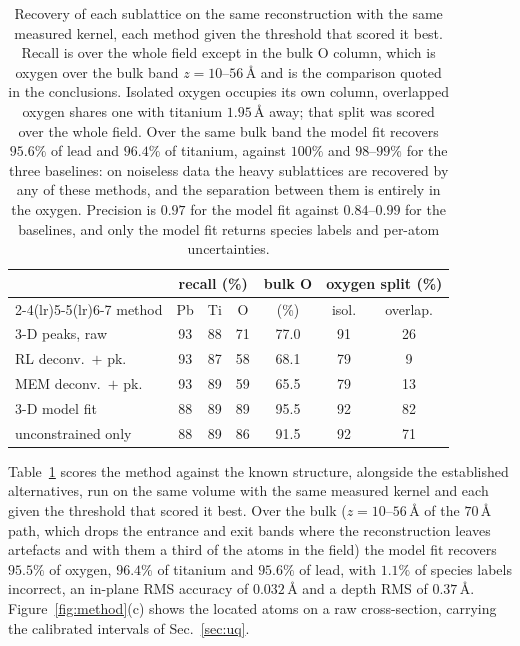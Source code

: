 \documentclass[aps,prb,twocolumn,superscriptaddress,floatfix,nofootinbib]{revtex4-2}
\begin{document}
\begin{table}[t]
  \centering \footnotesize
  \setlength{\tabcolsep}{2.5pt}
  \begin{tabular}{@{}lcccccc@{}}
    \toprule
    & \multicolumn{3}{c}{recall (\%)} & bulk O & \multicolumn{2}{c}{oxygen split (\%)} \\
    \cmidrule(lr){2-4}\cmidrule(lr){5-5}\cmidrule(lr){6-7}
    method & Pb & Ti & O & (\%) & isol. & overlap. \\
    \midrule
    3-D peaks, raw & 93 & 88 & 71 & 77.0 & 91 & 26 \\
    RL deconv.\ $+$ pk.          & 93 & 87 & 58 & 68.1 & 79 & \phantom{0}9 \\
    MEM deconv.\ $+$ pk.         & 93 & 89 & 59 & 65.5 & 79 & 13 \\
    3-D model fit                 & 88 & 89 & 89 & 95.5 & 92 & 82 \\
    \quad unconstrained only      & 88 & 89 & 86 & 91.5 & 92 & 71 \\
    \bottomrule
  \end{tabular}
  \caption{Recovery of each sublattice on the same reconstruction with the same measured kernel, each method given the threshold that scored it best. Recall is over the whole field except in the bulk O column, which is oxygen over the bulk band $z=10$--$56$\,\AA{} and is the comparison quoted in the conclusions. Isolated oxygen occupies its own column, overlapped oxygen shares one with titanium $1.95$\,\AA{} away; that split was scored over the whole field. Over the same bulk band the model fit recovers $95.6\%$ of lead and $96.4\%$ of titanium, against $100\%$ and $98$--$99\%$ for the three baselines: on noiseless data the heavy sublattices are recovered by any of these methods, and the separation between them is entirely in the oxygen. Precision is $0.97$ for the model fit against $0.84$--$0.99$ for the baselines, and only the model fit returns species labels and per-atom uncertainties.}
  \label{tab:detect}
\end{table}

Table~\ref{tab:detect} scores the method against the known structure, alongside the established alternatives, run on the same volume with the same measured kernel and each given the threshold that scored it best. Over the bulk ($z=10$--$56$\,\AA{} of the $70$\,\AA{} path, which drops the entrance and exit bands where the reconstruction leaves artefacts and with them a third of the atoms in the field) the model fit recovers $95.5\%$ of oxygen, $96.4\%$ of titanium and $95.6\%$ of lead, with $1.1\%$ of species labels incorrect, an in-plane RMS accuracy of $0.032$\,\AA{} and a depth RMS of $0.37$\,\AA. Figure~\ref{fig:method}(c) shows the located atoms on a raw cross-section, carrying the calibrated intervals of Sec.~\ref{sec:uq}.
\end{document}
